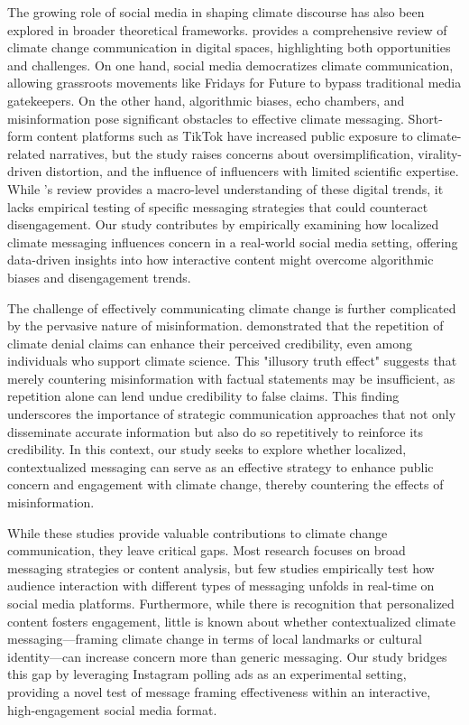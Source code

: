 \documentclass[a4paper,11pt]{article}
\begin{document}
The growing role of social media in shaping climate discourse has also been explored in broader theoretical frameworks. \cite{Schaefer2024} provides a comprehensive review of climate change communication in digital spaces, highlighting both opportunities and challenges. On one hand, social media democratizes climate communication, allowing grassroots movements like Fridays for Future to bypass traditional media gatekeepers. On the other hand, algorithmic biases, echo chambers, and misinformation pose significant obstacles to effective climate messaging. Short-form content platforms such as TikTok have increased public exposure to climate-related narratives, but the study raises concerns about oversimplification, virality-driven distortion, and the influence of influencers with limited scientific expertise. While \cite{Schaefer2024}’s review provides a macro-level understanding of these digital trends, it lacks empirical testing of specific messaging strategies that could counteract disengagement. Our study contributes by empirically examining how localized climate messaging influences concern in a real-world social media setting, offering data-driven insights into how interactive content might overcome algorithmic biases and disengagement trends.

The challenge of effectively communicating climate change is further complicated by the pervasive nature of misinformation. \cite{Jiang2024} demonstrated that the repetition of climate denial claims can enhance their perceived credibility, even among individuals who support climate science. This "illusory truth effect" suggests that merely countering misinformation with factual statements may be insufficient, as repetition alone can lend undue credibility to false claims. This finding underscores the importance of strategic communication approaches that not only disseminate accurate information but also do so repetitively to reinforce its credibility. In this context, our study seeks to explore whether localized, contextualized messaging can serve as an effective strategy to enhance public concern and engagement with climate change, thereby countering the effects of misinformation.

While these studies provide valuable contributions to climate change communication, they leave critical gaps. Most research focuses on broad messaging strategies or content analysis, but few studies empirically test how audience interaction with different types of messaging unfolds in real-time on social media platforms. Furthermore, while there is recognition that personalized content fosters engagement, little is known about whether contextualized climate messaging—framing climate change in terms of local landmarks or cultural identity—can increase concern more than generic messaging. Our study bridges this gap by leveraging Instagram polling ads as an experimental setting, providing a novel test of message framing effectiveness within an interactive, high-engagement social media format.
\end{document}
